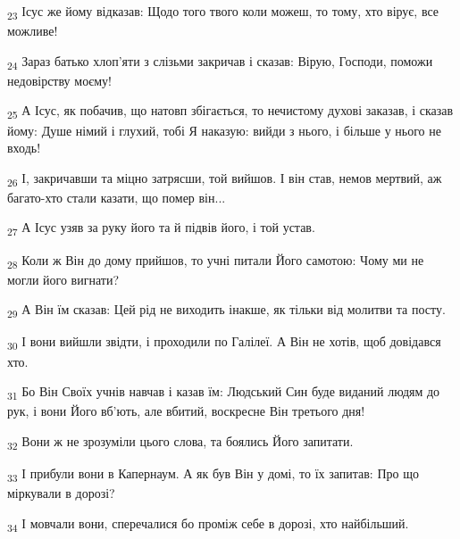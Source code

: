 \begin{tcolorbox}
\textsubscript{23} Ісус же йому відказав: Щодо того твого коли можеш, то тому, хто вірує, все можливе!
\end{tcolorbox}
\begin{tcolorbox}
\textsubscript{24} Зараз батько хлоп'яти з слізьми закричав і сказав: Вірую, Господи, поможи недовірству моєму!
\end{tcolorbox}
\begin{tcolorbox}
\textsubscript{25} А Ісус, як побачив, що натовп збігається, то нечистому духові заказав, і сказав йому: Душе німий і глухий, тобі Я наказую: вийди з нього, і більше у нього не входь!
\end{tcolorbox}
\begin{tcolorbox}
\textsubscript{26} І, закричавши та міцно затрясши, той вийшов. І він став, немов мертвий, аж багато-хто стали казати, що помер він...
\end{tcolorbox}
\begin{tcolorbox}
\textsubscript{27} А Ісус узяв за руку його та й підвів його, і той устав.
\end{tcolorbox}
\begin{tcolorbox}
\textsubscript{28} Коли ж Він до дому прийшов, то учні питали Його самотою: Чому ми не могли його вигнати?
\end{tcolorbox}
\begin{tcolorbox}
\textsubscript{29} А Він їм сказав: Цей рід не виходить інакше, як тільки від молитви та посту.
\end{tcolorbox}
\begin{tcolorbox}
\textsubscript{30} І вони вийшли звідти, і проходили по Галілеї. А Він не хотів, щоб довідався хто.
\end{tcolorbox}
\begin{tcolorbox}
\textsubscript{31} Бо Він Своїх учнів навчав і казав їм: Людський Син буде виданий людям до рук, і вони Його вб'ють, але вбитий, воскресне Він третього дня!
\end{tcolorbox}
\begin{tcolorbox}
\textsubscript{32} Вони ж не зрозуміли цього слова, та боялись Його запитати.
\end{tcolorbox}
\begin{tcolorbox}
\textsubscript{33} І прибули вони в Капернаум. А як був Він у домі, то їх запитав: Про що міркували в дорозі?
\end{tcolorbox}
\begin{tcolorbox}
\textsubscript{34} І мовчали вони, сперечалися бо проміж себе в дорозі, хто найбільший.
\end{tcolorbox}
